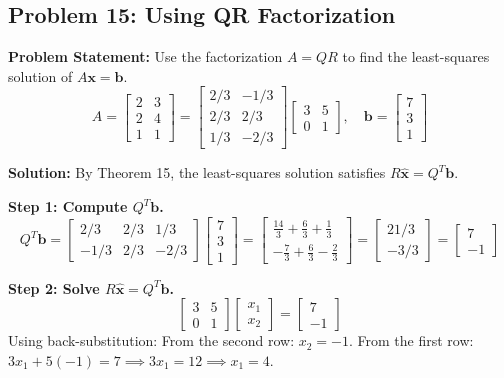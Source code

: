 \documentclass[11pt, letterpaper]{article}
\theoremstyle{definition}
\theoremstyle{remark}
\begin{document}
\subsection{Problem 15: Using QR Factorization}
\textbf{Problem Statement:} Use the factorization $A = QR$ to find the least-squares solution of $A\mathbf{x} = \mathbf{b}$.
\[ A = \begin{bmatrix} 2 & 3 \\ 2 & 4 \\ 1 & 1 \end{bmatrix} = \begin{bmatrix} 2/3 & -1/3 \\ 2/3 & 2/3 \\ 1/3 & -2/3 \end{bmatrix} \begin{bmatrix} 3 & 5 \\ 0 & 1 \end{bmatrix}, \quad \mathbf{b} = \begin{bmatrix} 7 \\ 3 \\ 1 \end{bmatrix} \]

\textbf{Solution:}
By Theorem 15, the least-squares solution satisfies $R\hat{\mathbf{x}} = Q^T \mathbf{b}$.

\textbf{Step 1: Compute $Q^T \mathbf{b}$.}
\[
Q^T \mathbf{b} = \begin{bmatrix} 2/3 & 2/3 & 1/3 \\ -1/3 & 2/3 & -2/3 \end{bmatrix} \begin{bmatrix} 7 \\ 3 \\ 1 \end{bmatrix} = \begin{bmatrix} \frac{14}{3} + \frac{6}{3} + \frac{1}{3} \\[4pt] -\frac{7}{3} + \frac{6}{3} - \frac{2}{3} \end{bmatrix} = \begin{bmatrix} 21/3 \\ -3/3 \end{bmatrix} = \begin{bmatrix} 7 \\ -1 \end{bmatrix}
\]

\textbf{Step 2: Solve $R\hat{\mathbf{x}} = Q^T \mathbf{b}$.}
\[
\begin{bmatrix} 3 & 5 \\ 0 & 1 \end{bmatrix} \begin{bmatrix} x_1 \\ x_2 \end{bmatrix} = \begin{bmatrix} 7 \\ -1 \end{bmatrix}
\]
Using back-substitution:
From the second row: $x_2 = -1$.
From the first row: $3x_1 + 5(-1) = 7 \implies 3x_1 = 12 \implies x_1 = 4$.
\end{document}
